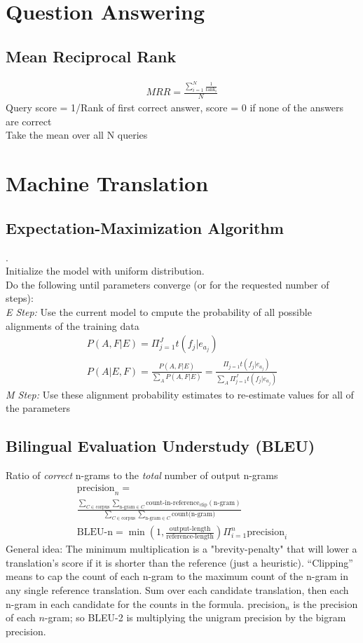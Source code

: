 \documentclass[10pt,twocolumn]{amsart}
\begin{document}
\section{Question Answering}
\subsection{Mean Reciprocal Rank}
\begin{gather*}
MRR = \frac{\sum_{i=1}^{N} \frac{1}{\text{rank}_i}}{N}
\end{gather*}
Query score = 1/Rank of first correct answer,
score = 0 if none of the answers are correct \\
Take the mean over all N queries
\section{Machine Translation}
\subsection{Expectation-Maximization Algorithm} .\\
Initialize the model with uniform distribution. \\
Do the following until parameters converge (or for the requested number of steps):\\
\emph{E Step: } Use the current model to cmpute the probability of all possible
                alignments of the training data \\
\begin{gather*}
P(A, F|E) = \Pi_{j=1}^{J} t\left(f_{j}|e_{a_{j}}\right) \\
P(A|E,F) = \frac{P(A,F|E)}{\sum_{A}P(A,F|E)} = \frac
{\Pi_{j=1}t(f_{j}|e_{a_{j}})}{\sum_{A}\Pi_{j=1}^{J}t(f_{j}|e_{a_{j}})}
\end{gather*}
\emph{M Step: } Use these alignment probability estimates to re-estimate values for
                all of the parameters
\subsection{Bilingual Evaluation Understudy (BLEU)}
Ratio of \emph{correct} n-grams to the \emph{total} number of output n-grams
\begin{gather*}
\text{precision}_{n} = \\ \frac
{\sum_{C \in \text{corpus}} \sum_{\text{n-gram} \in C} \text{count-in-reference}
_{\text{clip}}(\text{n-gram})}
{\sum_{C \in \text{corpus}} \sum_{\text{n-gram} \in C} \text{count(n-gram)}}  \\
\text{BLEU-n} = \min\left(1, \frac{\text{output-length}}{\text{reference-length}}
\right) \Pi_{i=1}^{n} \text{precision}_{i}
\end{gather*}
General idea: The minimum multiplication is a "brevity-penalty" that will lower
a translation's score if it is shorter than the reference (just a heuristic).
``Clipping'' means to cap the count of each n-gram to the maximum count of the
n-gram in any single reference translation. Sum over each candidate translation,
then each n-gram in each candidate for the counts in the formula. precision$_{n}$ is
the precision of each $n$-gram; so BLEU-2 is multiplying the unigram precision
by the bigram precision.
\end{document}
